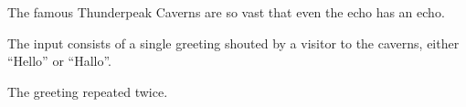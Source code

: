 
The famous Thunderpeak Caverns are so vast that even the echo has an echo.

\begin{Input}
  The input consists of a single greeting shouted by a visitor to the caverns, either ``Hello'' or ``Hallo''.
\end{Input}

\begin{Output}
  The greeting repeated twice.
\end{Output}
